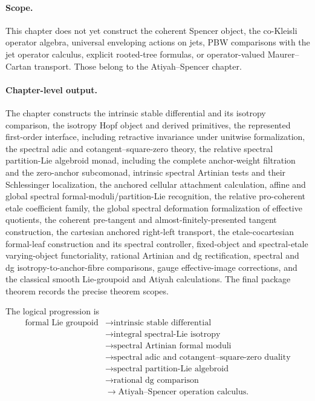 \paragraph{Scope.}
This chapter does not yet construct the coherent Spencer object, the
co-Kleisli operator algebra, universal enveloping actions on jets, PBW
comparisons with the jet operator calculus, explicit rooted-tree formulas, or
operator-valued Maurer--Cartan transport.  Those belong to the
Atiyah--Spencer chapter.

\paragraph{Chapter-level output.}
The chapter constructs the intrinsic stable differential and its isotropy
comparison, the isotropy Hopf object and derived primitives, the represented
first-order interface, including retractive invariance under unitwise
formalization, the spectral adic and cotangent--square-zero theory,
the relative spectral partition-Lie algebroid monad, including the complete
anchor-weight filtration and the zero-anchor subcomonad, intrinsic spectral
Artinian tests and their Schlessinger localization, the anchored cellular
attachment calculation, affine and global spectral formal-moduli/partition-Lie
recognition, the relative pro-coherent etale coefficient family, the global
spectral deformation formalization of effective quotients, the coherent
pre-tangent and almost-finitely-presented tangent construction, the cartesian
anchored right-left transport, the etale-cocartesian formal-leaf construction
and its spectral controller,
fixed-object and spectral-etale varying-object functoriality, rational Artinian and dg
rectification, spectral and dg
isotropy-to-anchor-fibre comparisons, gauge effective-image corrections, and
the classical smooth Lie-groupoid and Atiyah calculations.  The final package
theorem records the precise theorem scopes.

The logical progression is
\[
\boxed{
\begin{aligned}
\text{formal Lie groupoid}
&\longrightarrow \text{intrinsic stable differential}\\
&\longrightarrow \text{integral spectral-Lie isotropy}\\
&\longrightarrow \text{spectral Artinian formal moduli}\\
&\longrightarrow \text{spectral adic and cotangent--square-zero duality}\\
&\longrightarrow \text{spectral partition-Lie algebroid}\\
&\longrightarrow \text{rational dg comparison}\\
&\longrightarrow \text{Atiyah--Spencer operation calculus}.
\end{aligned}}
\]
